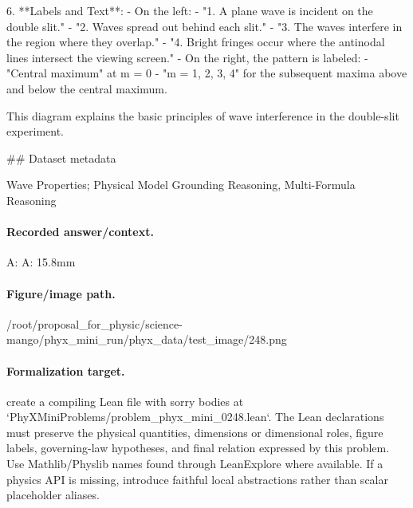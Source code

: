 6. **Labels and Text**: 
   - On the left: 
     - "1. A plane wave is incident on the double slit."
     - "2. Waves spread out behind each slit."
     - "3. The waves interfere in the region where they overlap."
     - "4. Bright fringes occur where the antinodal lines intersect the viewing screen."
   - On the right, the pattern is labeled:
     - "Central maximum" at m = 0
     - "m = 1, 2, 3, 4" for the subsequent maxima above and below the central maximum.

This diagram explains the basic principles of wave interference in the double-slit experiment.

\#\# Dataset metadata

Wave Properties; Physical Model Grounding Reasoning, Multi-Formula Reasoning

\paragraph{Recorded answer/context.}
A: A: 15.8mm

\paragraph{Figure/image path.}
/root/proposal\_for\_physic/science-mango/phyx\_mini\_run/phyx\_data/test\_image/248.png

\paragraph{Formalization target.}
create a compiling Lean file with sorry bodies at `PhyXMiniProblems/problem\_phyx\_mini\_0248.lean`. The Lean declarations must preserve the physical quantities, dimensions or dimensional roles, figure labels, governing-law hypotheses, and final relation expressed by this problem.
Use Mathlib/Physlib names found through LeanExplore where available. If a physics API is missing, introduce faithful local abstractions rather than scalar placeholder aliases.

